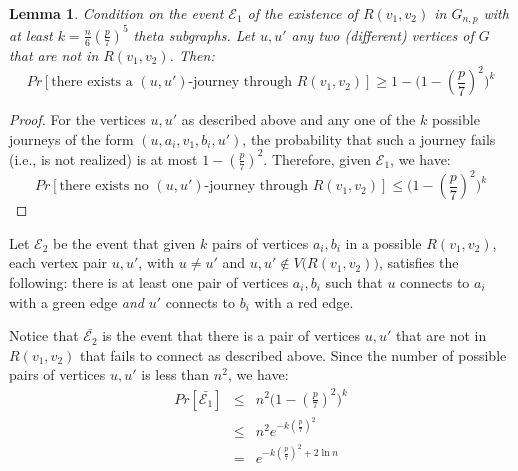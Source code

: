\documentclass[a4paper,UKenglish]{article}
\newtheorem{lemma}{Lemma}
\begin{document}
\begin{lemma}
Condition on the event $\mathcal{E}_1$ of the existence of $R(v_1,v_2)$ in $G_{n,p}$ with at least $k= \frac{n}{6} \left( \frac{p}{7} \right)^5$ theta subgraphs. Let $u,u'$ any two (different) vertices of $G$ that are not in $R(v_1,v_2)$. Then:
\[ Pr[\text{there exists a } (u,u') \text{-journey through } R(v_1,v_2)] \geq 1- \big(1- (\frac{p}{7})^2 \big)^k \]
\end{lemma}
\begin{proof}
For the vertices $u,u'$ as described above and any one of the $k$ possible journeys of the form $(u,a_i,v_1,b_i,u')$, the probability that such a journey fails (i.e., is not realized) is at most $1-\left( \frac{p}{7} \right)^2$. Therefore, given $\mathcal{E}_1$, we have:
\[ Pr[\text{there exists no } (u,u') \text{-journey through } R(v_1,v_2)] \leq \big(1- (\frac{p}{7})^2 \big)^k \]
\end{proof}

Let $\mathcal{E}_2$ be the event that given $k$ pairs of vertices $a_i,b_i$ in a possible $R(v_1,v_2)$, each vertex pair $u,u'$, with $u\not= u'$ and $u,u' \not \in V\big( R(v_1,v_2) \big)$, satisfies the following: there is at least one pair of vertices $a_i,b_i$ such that $u$ connects to $a_i$ with a green edge \emph{and} $u'$ connects to $b_i$ with a red edge.



Notice that $\bar{\mathcal{E}_2}$ is the event that there is a pair of vertices $u,u'$ that are not in $R(v_1,v_2)$ that fails to connect as described above. Since the number of possible pairs of vertices $u,u'$ is less than $n^2$, we have:
\begin{eqnarray*}
Pr[\bar{\mathcal{E}_1}] & \leq & n^2  \big(1- (\frac{p}{7})^2 \big)^k \\
 & \leq & n^2 e^{-k (\frac{p}{7})^2} \\
 & = & e^{-k (\frac{p}{7})^2 +2 \ln{n}}
\end{eqnarray*}
\end{document}
